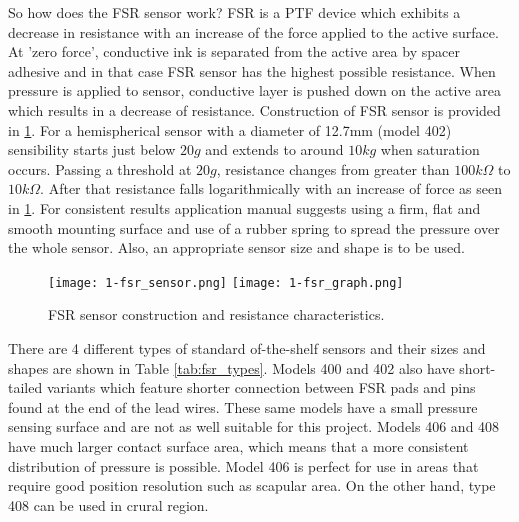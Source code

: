 So how does the \ac{FSR} sensor work? \ac{FSR} is a \ac{PTF} device which exhibits a decrease in resistance with an increase of the force applied to the active surface\cite{fsr_guide}. At 'zero force', conductive ink is separated from the active area by spacer adhesive and in that case \ac{FSR} sensor has the highest possible resistance. When pressure is applied to sensor, conductive layer is pushed down on the active area which results in a decrease of resistance. Construction of FSR sensor is provided in \ref{fig:fsr-sensor}. For a hemispherical sensor with a diameter of 12.7mm (model 402) sensibility starts just below $20 g$ and extends to around $10 kg$ when saturation occurs. Passing a threshold at $20 g$, resistance changes from greater than $100 k\Omega$ to $10 k\Omega$. After that resistance falls logarithmically with an increase of force as seen in \ref{fig:fsr-sensor}. For consistent results application manual\cite{fsr_guide} suggests using a firm, flat and smooth mounting surface and use of a rubber spring to spread the pressure over the whole sensor. Also, an appropriate sensor size and shape is to be used.

\begin{figure}[h]
  \begin{center}
    \texttt{[image: 1-fsr\_sensor.png]}
    \texttt{[image: 1-fsr\_graph.png]}
  \end{center}
  \caption{FSR sensor construction and resistance characteristics.}
  \label{fig:fsr-sensor}
\end{figure}

There are 4 different types of standard of-the-shelf sensors\cite{fsr_guide} and their sizes and shapes are shown in Table \ref{tab:fsr_types}. Models 400 and 402 also have short-tailed variants which feature shorter connection between \ac{FSR} pads and pins found at the end of the lead wires. These same models have a small pressure sensing surface and are not as well suitable for this project. Models 406 and 408 have much larger contact surface area, which means that a more consistent distribution of pressure is possible. Model 406 is perfect for use in areas that require good position resolution such as scapular area. On the other hand, type 408 can be used in crural region.

